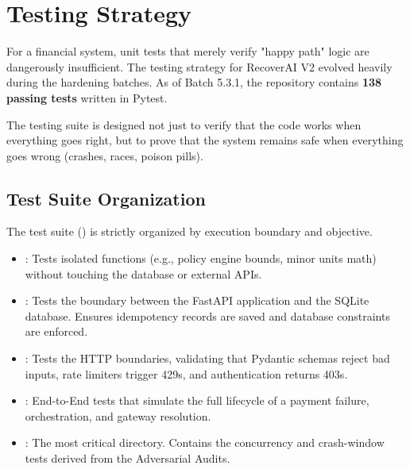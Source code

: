 
\section{Testing Strategy}

\begin{tcolorbox}[summarybox={\iconShield[1.5] Proving the Invariants}]
\color{textdark}
For a financial system, unit tests that merely verify "happy path" logic are dangerously insufficient. The testing strategy for RecoverAI V2 evolved heavily during the hardening batches. As of Batch 5.3.1, the repository contains \textbf{138 passing tests} written in Pytest.

The testing suite is designed not just to verify that the code works when everything goes right, but to prove that the system remains safe when everything goes wrong (crashes, races, poison pills).
\end{tcolorbox}

\vspace{0.8cm}

\subsection{Test Suite Organization}

The test suite () is strictly organized by execution boundary and objective.

\begin{tcolorbox}[featurebox={Test Directories}]
\begin{itemize}
    \item {}: Tests isolated functions (e.g., policy engine bounds, minor units math) without touching the database or external APIs.
    \item {}: Tests the boundary between the FastAPI application and the SQLite database. Ensures idempotency records are saved and database constraints are enforced.
    \item {}: Tests the HTTP boundaries, validating that Pydantic schemas reject bad inputs, rate limiters trigger 429s, and authentication returns 403s.
    \item {}: End-to-End tests that simulate the full lifecycle of a payment failure, orchestration, and gateway resolution.
    \item {}: The most critical directory. Contains the concurrency and crash-window tests derived from the Adversarial Audits.
\end{itemize}
\end{tcolorbox}

